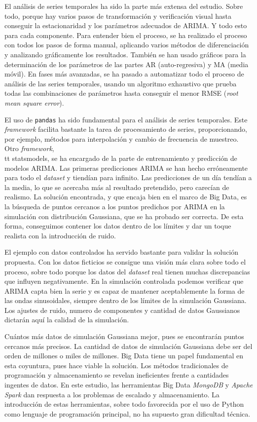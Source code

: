 \documentclass[11pt,spanish,listoffigures,listoftables]{tfgetsinf}
\begin{document}
El análisis de series temporales ha sido la parte más extensa del estudio. Sobre todo, porque hay varios pasos de transformación y verificación visual hasta conseguir la estacionaridad y los parámetros adecuados de ARIMA. Y todo esto para cada componente. Para entender bien el proceso, se ha realizado el proceso con todos los pasos de forma manual, aplicando varios métodos de diferenciación y analizando gráficamente los resultados. También se han usado gráficos para la determinación de los parámetros de las partes AR (auto-regresiva) y MA (media móvil). En fases más avanzadas, se ha pasado a automatizar todo el proceso de análisis de las series temporales, usando un algoritmo exhaustivo que prueba todas las combinaciones de parámetros hasta conseguir el menor RMSE ({\em root mean square error}).

El uso de {\tt pandas} ha sido fundamental para el análisis de series temporales. Este {\em framework} facilita bastante la tarea de procesamiento de series, proporcionando, por ejemplo, métodos para interpolación y cambio de frecuencia de muestreo. Otro {\em framework}, {\\tt statsmodels}, se ha encargado de la parte de entrenamiento y predicción de modelos ARIMA. Las primeras predicciones ARIMA se han hecho erróneamente para todo el {\em dataset} y tiendían para infinito. Las predicciones de un día tendían a la media, lo que se acercaba más al resultado pretendido, pero carecían de realismo. La solución encontrada, y que encaja bien en el marco de Big Data, es la búsqueda de puntos cercanos a los puntos predichos por ARIMA en la simulación con distribución Gaussiana, que se ha probado ser correcta. De esta forma, conseguimos contener los datos dentro de los límites y dar un toque realista con la introducción de ruido.

El ejemplo con datos controlados ha servido bastante para validar la solución propuesta. Con los datos ficticios se consigue una visión más clara sobre todo el proceso, sobre todo porque los datos del {\em dataset} real tienen muchas discrepancias que influyen negativamente. En la simulación controlada podemos verificar que ARIMA capta bien la serie y es capaz de mantener aceptablemente la forma de las ondas sinusoidales, siempre dentro de los límites de la simulación Gaussiana. Los ajustes de ruido, numero de componentes y cantidad de datos Gaussianos dictarán aquí la calidad de la simulación.

Cuántos más datos de simulación Gaussiana mejor, pues se encontrarán puntos cercanos más precisos. La cantidad de datos de simulación Gaussiana debe ser del orden de millones o miles de millones. Big Data tiene un papel fundamental en esta coyuntura, pues hace viable la solución. Los métodos tradicionales de programación y almacenamiento se revelan ineficientes frente a cantidades ingentes de datos. En este estudio, las herramientas Big Data {\em MongoDB} y {\em Apache Spark} dan respuesta a los problemas de escalado y almacenamiento. La introducción de estas herramientas, sobre todo favorecida por el uso de Python como lenguaje de programación principal, no ha supuesto gran dificultad técnica.
\end{document}
